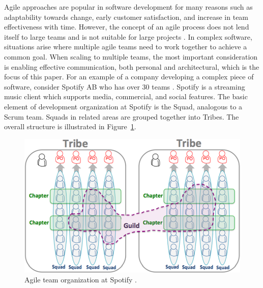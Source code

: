 
Agile approaches are popular in software development for many reasons such as adaptability towards change, early customer satisfaction, and increase in team effectiveness with time.
However, the concept of an agile process does not lend itself to large teams and is not suitable for large projects \cite{Rubin12}.
In complex software, situations arise where multiple agile teams need to work together to achieve a common goal.
When scaling to multiple teams, the most important consideration is enabling effective communication, both personal and architectural, which is the focus of this paper.
%
For an example of a company developing a complex piece of software, consider Spotify AB who has over 30 teams \cite{kniberg12}.
Spotify is a streaming music client which supports media, commercial, and social features.
The basic element of development organization at Spotify is the Squad, analogous to a Scrum team.
Squads in related areas are grouped together into Tribes. 
The overall structure is illustrated in Figure~\ref{fig:spotify_structure}.
\begin{figure}[h]
  \includegraphics[width=\linewidth]{images/kniberg12_structure.png}
  \caption{Agile team organization at Spotify \cite{kniberg12}.}
  \label{fig:spotify_structure}
\end{figure}


